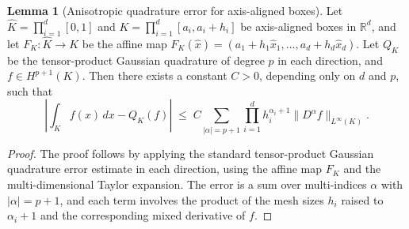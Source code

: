 \documentclass[oneside,reqno,11pt,a4paper]{amsart}
\theoremstyle{definition}
\newtheorem{lemma}{Lemma}[section]
\begin{document}
  
  \begin{lemma}[Anisotropic quadrature error for axis-aligned boxes]\label{lem:anisotropic-box-quad-error}
  Let $\widehat K = \prod_{i=1}^d [0,1]$ and $K = \prod_{i=1}^d [a_i, a_i + h_i]$ be axis-aligned boxes in $\mathbb{R}^d$, and let $F_K : \widehat K \to K$ be the affine map $F_K(\hat x) = (a_1 + h_1 \hat x_1, \ldots, a_d + h_d \hat x_d)$. Let $Q_K$ be the tensor-product Gaussian quadrature of degree $p$ in each direction, and $f \in H^{p+1}(K)$. Then there exists a constant $C > 0$, depending only on $d$ and $p$, such that
  \begin{equation}\label{eq:anisotropic-box-quad-error}
      \left|
        \int_K f(x)\,dx - Q_K(f)
      \right|
      \;\le\;
      C \sum_{|\alpha|=p+1} \prod_{i=1}^d h_i^{\alpha_i+1} \| D^\alpha f \|_{L^\infty(K)}. 
  \end{equation}
  \end{lemma}
  \begin{proof}
  The proof follows by applying the standard tensor-product Gaussian quadrature error estimate in each direction, using the affine map $F_K$ and the multi-dimensional Taylor expansion. The error is a sum over multi-indices $\alpha$ with $|\alpha| = p+1$, and each term involves the product of the mesh sizes $h_i$ raised to $\alpha_i+1$ and the corresponding mixed derivative of $f$. 
  \end{proof}
\end{document}
